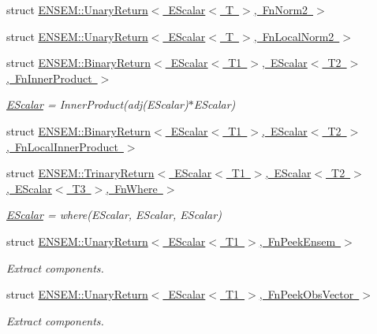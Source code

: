 \begin{DoxyCompactItemize}
\item 
struct \mbox{\hyperlink{structENSEM_1_1UnaryReturn_3_01EScalar_3_01T_01_4_00_01FnNorm2_01_4}{E\+N\+S\+E\+M\+::\+Unary\+Return$<$ E\+Scalar$<$ T $>$, Fn\+Norm2 $>$}}
\item 
struct \mbox{\hyperlink{structENSEM_1_1UnaryReturn_3_01EScalar_3_01T_01_4_00_01FnLocalNorm2_01_4}{E\+N\+S\+E\+M\+::\+Unary\+Return$<$ E\+Scalar$<$ T $>$, Fn\+Local\+Norm2 $>$}}
\item 
struct \mbox{\hyperlink{structENSEM_1_1BinaryReturn_3_01EScalar_3_01T1_01_4_00_01EScalar_3_01T2_01_4_00_01FnInnerProduct_01_4}{E\+N\+S\+E\+M\+::\+Binary\+Return$<$ E\+Scalar$<$ T1 $>$, E\+Scalar$<$ T2 $>$, Fn\+Inner\+Product $>$}}
\begin{DoxyCompactList}\small\item\em \mbox{\hyperlink{classENSEM_1_1EScalar}{E\+Scalar}} = Inner\+Product(adj(\+E\+Scalar)$\ast$\+E\+Scalar) \end{DoxyCompactList}\item 
struct \mbox{\hyperlink{structENSEM_1_1BinaryReturn_3_01EScalar_3_01T1_01_4_00_01EScalar_3_01T2_01_4_00_01FnLocalInnerProduct_01_4}{E\+N\+S\+E\+M\+::\+Binary\+Return$<$ E\+Scalar$<$ T1 $>$, E\+Scalar$<$ T2 $>$, Fn\+Local\+Inner\+Product $>$}}
\item 
struct \mbox{\hyperlink{structENSEM_1_1TrinaryReturn_3_01EScalar_3_01T1_01_4_00_01EScalar_3_01T2_01_4_00_01EScalar_3_01T3_01_4_00_01FnWhere_01_4}{E\+N\+S\+E\+M\+::\+Trinary\+Return$<$ E\+Scalar$<$ T1 $>$, E\+Scalar$<$ T2 $>$, E\+Scalar$<$ T3 $>$, Fn\+Where $>$}}
\begin{DoxyCompactList}\small\item\em \mbox{\hyperlink{classENSEM_1_1EScalar}{E\+Scalar}} = where(\+E\+Scalar, E\+Scalar, E\+Scalar) \end{DoxyCompactList}\item 
struct \mbox{\hyperlink{structENSEM_1_1UnaryReturn_3_01EScalar_3_01T1_01_4_00_01FnPeekEnsem_01_4}{E\+N\+S\+E\+M\+::\+Unary\+Return$<$ E\+Scalar$<$ T1 $>$, Fn\+Peek\+Ensem $>$}}
\begin{DoxyCompactList}\small\item\em Extract components. \end{DoxyCompactList}\item 
struct \mbox{\hyperlink{structENSEM_1_1UnaryReturn_3_01EScalar_3_01T1_01_4_00_01FnPeekObsVector_01_4}{E\+N\+S\+E\+M\+::\+Unary\+Return$<$ E\+Scalar$<$ T1 $>$, Fn\+Peek\+Obs\+Vector $>$}}
\begin{DoxyCompactList}\small\item\em Extract components. \end{DoxyCompactList}\item 

\end{DoxyCompactItemize}
